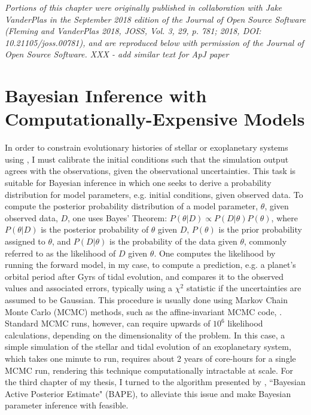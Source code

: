 \textit{Portions of this chapter were originally published in collaboration with Jake VanderPlas in the September 2018 edition of the Journal of Open Source Software (Fleming and VanderPlas 2018, JOSS, Vol. 3, 29, p. 781; 2018, DOI: 10.21105/joss.00781), and are reproduced below with permission of the Journal of Open Source Software. XXX - add similar text for ApJ paper}

\section{Bayesian Inference with Computationally-Expensive Models}

In order to constrain evolutionary histories of stellar or exoplanetary systems using \vplanet, I must calibrate the initial conditions such that the simulation output agrees with the observations, given the observational uncertainties.  This task is suitable for Bayesian inference in which one seeks to derive a probability distribution for model parameters, e.g. \vplanet initial conditions, given observed data.  To compute the posterior probability distribution of a model parameter, $\theta$, given observed data, $D$, one uses Bayes' Theorem: $P(\theta | D) \propto P(D | \theta) P(\theta)$, where $P(\theta | D)$ is the posterior probability of $\theta$ given $D$, $P(\theta)$ is the prior probability assigned to $\theta$, and $P(D | \theta)$ is the probability of the data given $\theta$, commonly referred to as the likelihood of $D$ given $\theta$.  One computes the likelihood by running the forward model, \vplanet in my case, to compute a prediction, e.g. a planet's orbital period after Gyrs of tidal evolution, and compares it to the observed values and associated errors, typically using a $\chi^2$ statistic if the uncertainties are assumed to be Gaussian.  This procedure is usually done using Markov Chain Monte Carlo (MCMC) methods, such as the affine-invariant MCMC code, \emcee \citep{ForemanMackey2013}. Standard MCMC runs, however, can require upwards of $10^6$ likelihood calculations, depending on the dimensionality of the problem.  In this case, a simple \vplanet simulation of the stellar and tidal evolution of an exoplanetary system, which takes one minute to run, requires about 2 years of core-hours for a single MCMC run, rendering this technique computationally intractable at scale.  For the third chapter of my thesis, I turned to the algorithm presented by \citet{Kandasamy2017}, ``Bayesian Active Posterior Estimate" (BAPE), to alleviate this issue and make Bayesian parameter inference with \vplanet feasible.

